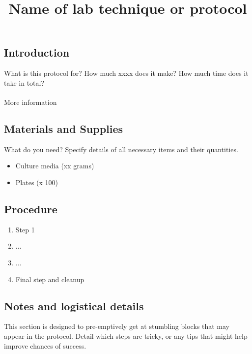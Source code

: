 \documentclass[a4paper,11pt]{article}
\title{Name of lab technique or protocol}
\author{}
\date{}
\begin{document}
\setcounter{page}{1}
\maketitle
{}








\subsection*{Introduction}

What is this protocol for? How much xxxx does it make? How much time does it take in total?



\paragraph*{}
More information










\subsection*{Materials and Supplies}

What do you need? Specify details of all necessary items and their quantities.


\begin{itemize}
	\item Culture media (xx grams)
	\item Plates (x 100)
\end{itemize}








\subsection*{Procedure}

\begin{enumerate}

	\item Step 1

	\item ...

	\item ...

	\item Final step and cleanup

\end{enumerate}







\subsection*{Notes and logistical details}

This section is designed to pre-emptively get at stumbling blocks that may appear in the protocol. Detail which steps are tricky, or any tips that might help improve chances of success.









\clearpage


\end{document}
